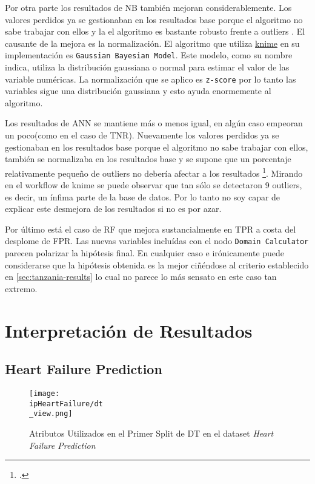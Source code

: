 \documentclass[..]{subfiles}
\begin{document}
Por otra parte los resultados de NB también mejoran considerablemente. Los valores perdidos ya se gestionaban en los resultados base porque el algoritmo no sabe trabajar con ellos y la el algoritmo es bastante robusto frente a outliers . El causante de la mejora es la normalización. El algoritmo que utiliza \href{https://hub.knime.com/knime/extensions/org.knime.features.base/latest/org.knime.base.node.mine.bayes.naivebayes.learner3.NaiveBayesLearnerNodeFactory4}{knime} en su implementación es \texttt{Gaussian Bayesian Model}. Este modelo, como su nombre indica, utiliza la distribución gaussiana o normal para estimar el valor de las variable numéricas. La normalización que se aplico es \texttt{z-score} por lo tanto las variables sigue una distribución gaussiana y esto ayuda enormemente al algoritmo.

Los resultados de ANN se mantiene más o menos igual, en algún caso empeoran un poco(como en el caso de TNR). Nuevamente los valores perdidos ya se gestionaban en los resultados base porque el algoritmo no sabe trabajar con ellos, también se normalizaba en los resultados base y se supone que un porcentaje relativamente pequeño de outliers no debería afectar a los resultados \footcite{annOutliers}. Mirando en el workflow de knime se puede observar que tan sólo se detectaron 9 outliers, es decir, un ínfima parte de la base de datos. Por lo tanto no soy capar de explicar este desmejora de los resultados si no es por azar.

Por último está el caso de RF que mejora sustancialmente en TPR a costa del desplome de FPR. Las nuevas variables incluídas con el nodo \texttt{Domain Calculator} parecen polarizar la hipótesis final. En cualquier caso e irónicamente puede considerarse que la hipótesis obtenida es la mejor ciñéndose al criterio establecido en \ref{sec:tanzania-results} lo cual no parece lo más sensato en este caso tan extremo.



\section{Interpretación de Resultados}

\subsection{Heart Failure Prediction}

\begin{figure}[h!]
	\centering
	\texttt{[image: \\ipHeartFailure/dt\\\_view.png]}
	\caption{Atributos Utilizados en el Primer Split de DT en el dataset \textit{Heart Failure Prediction}}%
\end{figure}
\end{document}
